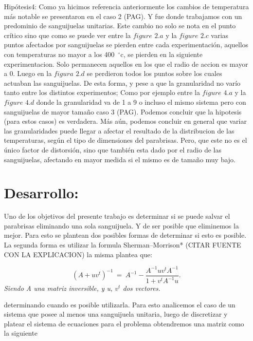 \documentclass[a4paper]{article}
\begin{document}
Hipótesis4: Como ya hicimos referencia anteriormente los cambios de temperatura más notable se presentaron en el caso 2 (PAG). Y fue donde trabajamos con un predominio de sanguijuelas unitarias. Este cambio no solo se nota en el punto crítico sino que como se puede ver entre la $figure$ $2.a$ y la $figure$ $2.c$ varias puntos afectados por sanguijuelas se pierden entre cada experimentación, aquellos con temperaturas no mayor a los 400\hspace{-1.5mm}$\phantom{a}^{\circ}$c, se pierden en la siguiente experimentacion. Solo permanecen aquellos en los que el radio de accion es mayor a 0. Luego en la $figura$ $2.d$ se perdieron todos los puntos sobre los cuales actuaban las sanguijuelas. De esta forma, y pese a que la granularidad no varío tanto entre los distintos experimentos; Como por ejemplo entre la $figure$ $4.a$ y la $figure$ $4.d$ donde la granularidad va de 1 a 9 o  incluso el mismo sistema pero  con sanguijuelas de mayor tamaño caso 3 (PAG). Podemos concluir que la hipotesis (para estos casos) es verdadera. Más aún, podemos concluir en general que variar las granularidades puede llegar a afectar el resultado de la distribucion de las temperaturas, según el tipo de dimensiones del parabrisas. Pero, que este no es el único factor de distorsión, sino que también esta dado por el radio de las sanguijuelas, afectando en mayor medida si el mismo es de tamaño muy bajo.  




\section{Desarrollo:}


Uno de los objetivos del presente trabajo es determinar si se puede salvar el parabrisas eliminando una sola sanguijuela. Y de ser posible que eliminemos la mejor. Para esto se plantean dos posibles formas de determinar si esto es posible. La segunda forma es utilizar la formula Sherman–Morrison* (CITAR FUENTE CON LA EXPLICACION) la misma plantea que:

\begin{equation}
	(A+ uv^t)^{-1} \ =\ A^{-1} - \frac{ A^{-1} u v^t A^{-1} }{1+v^t A^{-1}u}.\label{eq:sm}
\end{equation} 
\textit{Siendo A una matriz inversible, y u, $v^t$ dos vectores.}


determinando cuando es posible utilizarla. Para esto analicemos el caso de un sistema que posee al menos una sanguijuela unitaria, luego de discretizar y platear el sistema de ecuaciones para el problema obtendremos una matriz como la siguiente
\end{document}
